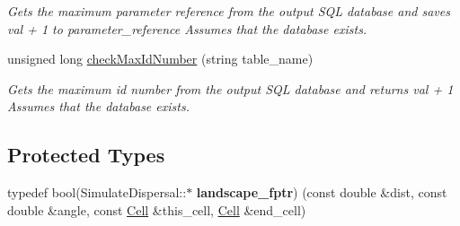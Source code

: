 \begin{DoxyCompactItemize}
\begin{DoxyCompactList}\small\item\em Gets the maximum parameter reference from the output S\+QL database and saves val + 1 to parameter\+\_\+reference Assumes that the database exists. \end{DoxyCompactList}\item 
unsigned long \hyperlink{class_simulate_dispersal_abafd3fc30df157d12e462c4b1907d8fa}{check\+Max\+Id\+Number} (string table\+\_\+name)
\begin{DoxyCompactList}\small\item\em Gets the maximum id number from the output S\+QL database and returns val + 1 Assumes that the database exists. \end{DoxyCompactList}\end{DoxyCompactItemize}
\subsection*{Protected Types}
\begin{DoxyCompactItemize}
\item 
typedef bool(Simulate\+Dispersal\+::$\ast$ {\bfseries landscape\+\_\+fptr}) (const double \&dist, const double \&angle, const \hyperlink{struct_cell}{Cell} \&this\+\_\+cell, \hyperlink{struct_cell}{Cell} \&end\+\_\+cell)\hypertarget{class_simulate_dispersal_a33cf29f05f05fbf3cd70f759e62f57f0}{}\label{class_simulate_dispersal_a33cf29f05f05fbf3cd70f759e62f57f0}

\end{DoxyCompactItemize}
